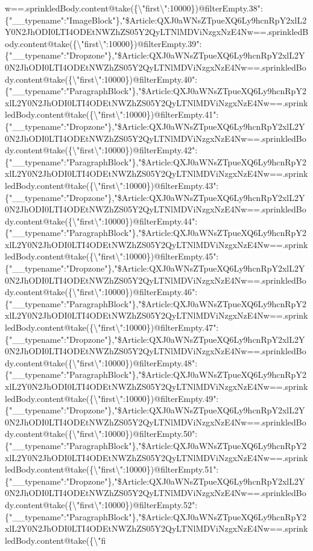w==.sprinkledBody.content@take(\{\textbackslash{}"first\textbackslash{}":10000\})@filterEmpty.38":\{"\_\_typename":"ImageBlock"\},"\$Article:QXJ0aWNsZTpueXQ6Ly9hcnRpY2xlL2Y0N2JhODI0LTI4ODEtNWZhZS05Y2QyLTNlMDViNzgxNzE4Nw==.sprinkledBody.content@take(\{\textbackslash{}"first\textbackslash{}":10000\})@filterEmpty.39":\{"\_\_typename":"Dropzone"\},"\$Article:QXJ0aWNsZTpueXQ6Ly9hcnRpY2xlL2Y0N2JhODI0LTI4ODEtNWZhZS05Y2QyLTNlMDViNzgxNzE4Nw==.sprinkledBody.content@take(\{\textbackslash{}"first\textbackslash{}":10000\})@filterEmpty.40":\{"\_\_typename":"ParagraphBlock"\},"\$Article:QXJ0aWNsZTpueXQ6Ly9hcnRpY2xlL2Y0N2JhODI0LTI4ODEtNWZhZS05Y2QyLTNlMDViNzgxNzE4Nw==.sprinkledBody.content@take(\{\textbackslash{}"first\textbackslash{}":10000\})@filterEmpty.41":\{"\_\_typename":"Dropzone"\},"\$Article:QXJ0aWNsZTpueXQ6Ly9hcnRpY2xlL2Y0N2JhODI0LTI4ODEtNWZhZS05Y2QyLTNlMDViNzgxNzE4Nw==.sprinkledBody.content@take(\{\textbackslash{}"first\textbackslash{}":10000\})@filterEmpty.42":\{"\_\_typename":"ParagraphBlock"\},"\$Article:QXJ0aWNsZTpueXQ6Ly9hcnRpY2xlL2Y0N2JhODI0LTI4ODEtNWZhZS05Y2QyLTNlMDViNzgxNzE4Nw==.sprinkledBody.content@take(\{\textbackslash{}"first\textbackslash{}":10000\})@filterEmpty.43":\{"\_\_typename":"Dropzone"\},"\$Article:QXJ0aWNsZTpueXQ6Ly9hcnRpY2xlL2Y0N2JhODI0LTI4ODEtNWZhZS05Y2QyLTNlMDViNzgxNzE4Nw==.sprinkledBody.content@take(\{\textbackslash{}"first\textbackslash{}":10000\})@filterEmpty.44":\{"\_\_typename":"ParagraphBlock"\},"\$Article:QXJ0aWNsZTpueXQ6Ly9hcnRpY2xlL2Y0N2JhODI0LTI4ODEtNWZhZS05Y2QyLTNlMDViNzgxNzE4Nw==.sprinkledBody.content@take(\{\textbackslash{}"first\textbackslash{}":10000\})@filterEmpty.45":\{"\_\_typename":"Dropzone"\},"\$Article:QXJ0aWNsZTpueXQ6Ly9hcnRpY2xlL2Y0N2JhODI0LTI4ODEtNWZhZS05Y2QyLTNlMDViNzgxNzE4Nw==.sprinkledBody.content@take(\{\textbackslash{}"first\textbackslash{}":10000\})@filterEmpty.46":\{"\_\_typename":"ParagraphBlock"\},"\$Article:QXJ0aWNsZTpueXQ6Ly9hcnRpY2xlL2Y0N2JhODI0LTI4ODEtNWZhZS05Y2QyLTNlMDViNzgxNzE4Nw==.sprinkledBody.content@take(\{\textbackslash{}"first\textbackslash{}":10000\})@filterEmpty.47":\{"\_\_typename":"Dropzone"\},"\$Article:QXJ0aWNsZTpueXQ6Ly9hcnRpY2xlL2Y0N2JhODI0LTI4ODEtNWZhZS05Y2QyLTNlMDViNzgxNzE4Nw==.sprinkledBody.content@take(\{\textbackslash{}"first\textbackslash{}":10000\})@filterEmpty.48":\{"\_\_typename":"ParagraphBlock"\},"\$Article:QXJ0aWNsZTpueXQ6Ly9hcnRpY2xlL2Y0N2JhODI0LTI4ODEtNWZhZS05Y2QyLTNlMDViNzgxNzE4Nw==.sprinkledBody.content@take(\{\textbackslash{}"first\textbackslash{}":10000\})@filterEmpty.49":\{"\_\_typename":"Dropzone"\},"\$Article:QXJ0aWNsZTpueXQ6Ly9hcnRpY2xlL2Y0N2JhODI0LTI4ODEtNWZhZS05Y2QyLTNlMDViNzgxNzE4Nw==.sprinkledBody.content@take(\{\textbackslash{}"first\textbackslash{}":10000\})@filterEmpty.50":\{"\_\_typename":"ParagraphBlock"\},"\$Article:QXJ0aWNsZTpueXQ6Ly9hcnRpY2xlL2Y0N2JhODI0LTI4ODEtNWZhZS05Y2QyLTNlMDViNzgxNzE4Nw==.sprinkledBody.content@take(\{\textbackslash{}"first\textbackslash{}":10000\})@filterEmpty.51":\{"\_\_typename":"Dropzone"\},"\$Article:QXJ0aWNsZTpueXQ6Ly9hcnRpY2xlL2Y0N2JhODI0LTI4ODEtNWZhZS05Y2QyLTNlMDViNzgxNzE4Nw==.sprinkledBody.content@take(\{\textbackslash{}"first\textbackslash{}":10000\})@filterEmpty.52":\{"\_\_typename":"ParagraphBlock"\},"\$Article:QXJ0aWNsZTpueXQ6Ly9hcnRpY2xlL2Y0N2JhODI0LTI4ODEtNWZhZS05Y2QyLTNlMDViNzgxNzE4Nw==.sprinkledBody.content@take(\{\textbackslash{}"fi